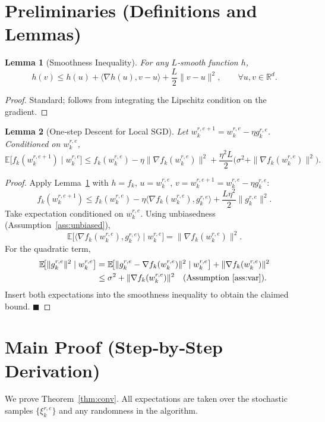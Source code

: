\documentclass{article}
\newtheorem{lemma}{Lemma}
\newcommand{\E}{\mathbb{E}}
\newcommand{\R}{\mathbb{R}}
\begin{document}
\newpage
\section*{Preliminaries (Definitions and Lemmas)}
\begin{lemma}[Smoothness Inequality]\label{lem:smooth}
For any $L$‑smooth function $h$,
\[
h(v)\le h(u)+\langle\nabla h(u),v-u\rangle+\frac{L}{2}\|v-u\|^{2},
\qquad\forall u,v\in\R^{d}.
\]
\end{lemma}
\begin{proof}
Standard; follows from integrating the Lipschitz condition on the gradient.
\end{proof}

\begin{lemma}[One‑step Descent for Local SGD]\label{lem:onestep}
Let $w_{k}^{r,e+1}=w_{k}^{r,e}-\eta g_{k}^{r,e}$.
Conditioned on $w_{k}^{r,e}$,
\[
\E\bigl[f_k(w_{k}^{r,e+1})\mid w_{k}^{r,e}\bigr]
\le f_k(w_{k}^{r,e})-\eta\|\nabla f_k(w_{k}^{r,e})\|^{2}
+\frac{\eta^{2}L}{2}\bigl(\sigma^{2}+\|\nabla f_k(w_{k}^{r,e})\|^{2}\bigr).
\]
\end{lemma}
\begin{proof}
Apply Lemma~\ref{lem:smooth} with $h=f_k$, $u=w_{k}^{r,e}$,
$v=w_{k}^{r,e+1}=w_{k}^{r,e}-\eta g_{k}^{r,e}$:
\[
f_k(w_{k}^{r,e+1})\le f_k(w_{k}^{r,e})-\eta\langle\nabla f_k(w_{k}^{r,e}),g_{k}^{r,e}\rangle
+\frac{L\eta^{2}}{2}\|g_{k}^{r,e}\|^{2}.
\]
Take expectation conditioned on $w_{k}^{r,e}$.
Using unbiasedness (Assumption~\ref{ass:unbiased}),
\[
\E\!\bigl[\langle\nabla f_k(w_{k}^{r,e}),g_{k}^{r,e}\rangle\mid w_{k}^{r,e}\bigr]
=\|\nabla f_k(w_{k}^{r,e})\|^{2}.
\]
For the quadratic term,
\[
\begin{aligned}
\E\!\bigl[\|g_{k}^{r,e}\|^{2}\mid w_{k}^{r,e}\bigr]
&=\E\!\bigl[\|g_{k}^{r,e}-\nabla f_k(w_{k}^{r,e})\|^{2}\mid w_{k}^{r,e}\bigr]
+\|\nabla f_k(w_{k}^{r,e})\|^{2}\\
&\le\sigma^{2}+\|\nabla f_k(w_{k}^{r,e})\|^{2}\quad\text{(Assumption~\ref{ass:var})}.
\end{aligned}
\]
Insert both expectations into the smoothness inequality to obtain the claimed bound. \hfill $\blacksquare$
\end{proof}

\section*{Main Proof (Step‑by‑Step Derivation)}
We prove Theorem~\ref{thm:conv}.  All expectations are taken over the stochastic
samples $\{\xi_{k}^{r,e}\}$ and any randomness in the algorithm.
\end{document}
